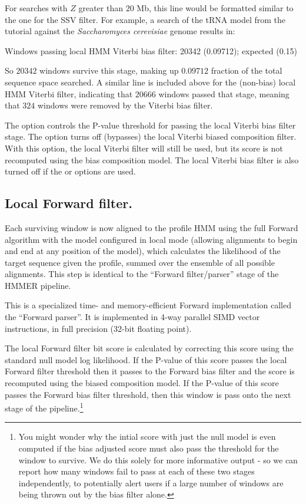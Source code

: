 \begin{sreoutput}
For searches with $Z$ greater than $20$ Mb, this line would be
formatted similar to the one for the SSV filter. For example,
a search of the tRNA model from the tutorial against the
\emph{Saccharomyces cerevisiae} genome results in:

\begin{sreoutput}
Windows   passing  local HMM Viterbi  bias filter:           20342  (0.09712); expected (0.15)
\end{sreoutput}

So $20342$ windows survive this stage, making up $0.09712$ fraction of
the total sequence space searched. A similar line is included above
for the (non-bias) local HMM Viterbi filter, indicating that $20666$
windows passed that stage, meaning that $324$ windows were removed by
the Viterbi bias filter. 

The  option controls the P-value threshold for
passing the local Viterbi bias filter stage.  The 
option turns off (bypasses) the local Viterbi biased composition
filter. With this option, the local Viterbi filter will still be used,
but its score is not recomputed using the bias composition model.  The
local Viterbi bias filter is also turned off if the  or
 options are used.

\subsection{Local Forward filter.}

Each surviving window is now aligned to the profile HMM using the full
Forward algorithm with the model configured in local mode (allowing
alignments to begin and end at any position of the model), which
calculates the likelihood of the target sequence given the profile,
summed over the ensemble of all possible alignments. This step is
identical to the ``Forward filter/parser'' stage of the HMMER
pipeline.

This is a specialized time- and memory-efficient Forward
implementation called the ``Forward parser''. It is implemented in
4-way parallel SIMD vector instructions, in full precision (32-bit
floating point). 

The local Forward filter bit score is calculated by correcting this
score using the standard null model log likelihood.  If the P-value of
this score passes the local Forward filter threshold then it passes to
the Forward bias filter and the score is recomputed using the biased
composition model. If the P-value of this score passes the Forward
bias filter threshold, then this window is pass onto the next stage of
the pipeline.\footnote{You might wonder why the intial score with just
the null model is even computed if the bias adjusted score must also
pass the threshold for the window to survive. We do this solely for
more informative output - so we can report how many windows fail to
pass at each of these two stages independently, to potentially alert
users if a large number of windows are being thrown out by the bias
filter alone.} 


\end{sreoutput}
